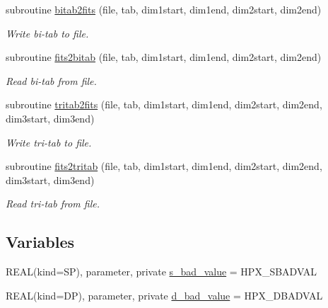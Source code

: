\begin{DoxyCompactItemize}
subroutine \hyperlink{namespacef3dex__fitstools_ae6aed20f64a46bb7d9d33b1c56f89cd0}{bitab2fits} (file, tab, dim1start, dim1end, dim2start, dim2end)
\begin{DoxyCompactList}\small\item\em Write bi-\/tab to file. \end{DoxyCompactList}\item 
subroutine \hyperlink{namespacef3dex__fitstools_a5c4a0cf23d0152d7449eb2afb09ad563}{fits2bitab} (file, tab, dim1start, dim1end, dim2start, dim2end)
\begin{DoxyCompactList}\small\item\em Read bi-\/tab from file. \end{DoxyCompactList}\item 
subroutine \hyperlink{namespacef3dex__fitstools_a98c44872e5b5937bef4cccfcc2a21c43}{tritab2fits} (file, tab, dim1start, dim1end, dim2start, dim2end, dim3start, dim3end)
\begin{DoxyCompactList}\small\item\em Write tri-\/tab to file. \end{DoxyCompactList}\item 
subroutine \hyperlink{namespacef3dex__fitstools_a1daf125726e201b6f4f84e709e23ccc0}{fits2tritab} (file, tab, dim1start, dim1end, dim2start, dim2end, dim3start, dim3end)
\begin{DoxyCompactList}\small\item\em Read tri-\/tab from file. \end{DoxyCompactList}\end{DoxyCompactItemize}
\subsection*{Variables}
\begin{DoxyCompactItemize}
\item 
REAL(kind=SP), parameter, private \hyperlink{namespacef3dex__fitstools_a7841ef704a851792da5858a872caa0e4}{s\_\-bad\_\-value} = HPX\_\-SBADVAL
\item 
REAL(kind=DP), parameter, private \hyperlink{namespacef3dex__fitstools_ae70f4f4f98f16a18e429bfd5f014d650}{d\_\-bad\_\-value} = HPX\_\-DBADVAL
\end{DoxyCompactItemize}



